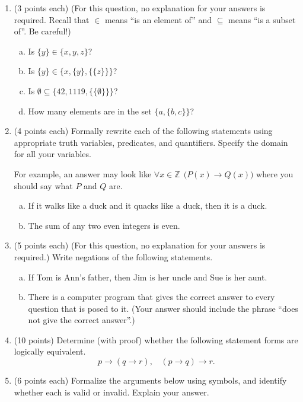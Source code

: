 \documentclass[12pt]{article}
\begin{document}
\begin{enumerate}[1.]
\vskip 0.2in
\item(3 points each)
(For this question, no explanation for your answers is required. Recall that $\in$ means
``is an element of'' and $\subseteq$ means ``is a subset of''. Be careful!)
\begin{enumerate}[(a)]
\item
Is $\{y\} \in \{x, y, z\}$?
\item
Is $\{y\} \in \{x, \{y\}, \{ \{ z \} \} \}$?
\item
Is $\emptyset \subseteq \{42, 1119, \{ \{ \emptyset \} \} \}$?
\item
How many elements are in the set $\{a, \{b, c\} \}$?
\end{enumerate}

\item(4 points each)
Formally rewrite each of the following statements using appropriate truth variables,
predicates, and quantifiers. Specify the domain for all your variables.

For example, an answer may look like
$\forall x \in \mathbb{Z} \ \  \big(P(x) \rightarrow Q(x)\big)$ where you should say what $P$ and $Q$ are.

\begin{enumerate}[(a)]
\item
If it walks like a duck and it quacks like a duck, then it is a duck.
\item
The sum of any two even integers is even.
\end{enumerate}
\vskip 0.2in
\item(5 points each)
(For this question, no explanation for your answers is required.) Write negations of the following
statements.

\begin{enumerate}[(a)]
\item
If Tom is Ann's father, then Jim is her uncle and Sue is her aunt.
\item
There is a computer program that gives the correct answer to every question that is posed to it.
(Your answer should include the phrase ``does not give the correct answer''.)
\end{enumerate}

\item(10 points)
Determine (with proof) whether the following statement forms are logically equivalent.
$$p \rightarrow (q \rightarrow r), \ \ \ \ (p \rightarrow q) \rightarrow r.$$

\item(6 points each)
Formalize the arguments below using symbols, and identify whether each is valid or invalid.
Explain your answer. 


\end{enumerate}
\end{document}

